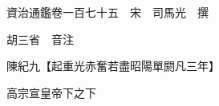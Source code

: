 










 


 
 


 

  
  
  
  
  





  
  
  
  
  
 
  

  

  
  
  



  

 
 

  
   




  

  
  


  　　資治通鑑卷一百七十五　宋　司馬光　撰

　　胡三省　音注

　　陳紀九【起重光赤奮若盡昭陽單閼凡三年】

　　高宗宣皇帝下之下

